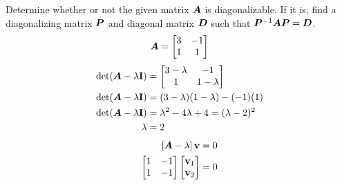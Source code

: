 \documentclass{article}
\begin{document}
Determine whether or not the given matrix $ \bm{A} $ is diagonalizable. If it is, find a diagonalizing matrix $ \bm{P} $ and diagonal matrix $ \bm{D} $ such that $ \bm{P}^{-1}\bm{A}\bm{P} = \bm{D} $.
\begin{equation*}
	\bm{A} =
		\begin{bmatrix}
			3 & -1 \\
			1 & 1
		\end{bmatrix}
\end{equation*}
\begin{align*}
	\det( \matr{A} - \lambda \vect{I} ) & =
		\begin{bmatrix}
			3 - \lambda & -1 \\
			1 & 1 - \lambda
		\end{bmatrix} \\
	\det( \matr{A} - \lambda \vect{I} ) & =
		(3 - \lambda)(1 - \lambda) - (-1)(1) \\
	\det( \matr{A} - \lambda \vect{I} ) & =
		\lambda^2 - 4\lambda + 4 = (\lambda - 2)^2 \\
	\lambda & = 2
\end{align*}
\begin{align*}
	\left[ \matr{A} - \lambda \right] \vect{v} & = 0 \\
	\begin{bmatrix}
		1 & -1 \\
		1 & -1
	\end{bmatrix}
	\begin{bmatrix} \vect{v}_1 \\ \vect{v}_2 \end{bmatrix} & = 0
\end{align*}
\begin{align*}

\end{align*}
\end{document}
